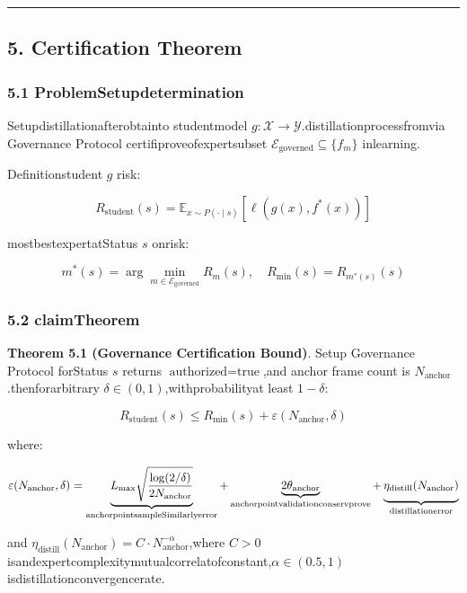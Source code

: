 \documentclass[
  12pt,
]{article}
\begin{document}
\begin{center}\rule{0.5\linewidth}{0.5pt}\end{center}

\subsection{5. Certification Theorem}\label{certification-theorem}

\subsubsection{5.1 ProblemSetupdetermination}\label{ux95eeux9898ux8bbeux5b9a}

Setupdistillationafterobtainto studentmodel \(g: \mathcal{X} \to \mathcal{Y}\).distillationprocessfromvia
Governance Protocol certifiproveofexpertsubset
\(\mathcal{E}_{\text{governed}} \subseteq \{f_m\}\) inlearning.

Definitionstudent \(g\) risk:

\[R_{\text{student}}(s) = \mathbb{E}_{x \sim P(\cdot \mid s)}[\ell(g(x), f^*(x))]\]

mostbestexpertatStatus \(s\) onrisk:

\[m^*(s) = \arg\min_{m \in \mathcal{E}_{\text{governed}}} R_m(s), \quad R_{\min}(s) = R_{m^*(s)}(s)\]

\subsubsection{5.2 claimTheorem}\label{ux4e3bux5b9aux7406}

\textbf{Theorem 5.1 (Governance Certification Bound)}. Setup Governance
Protocol forStatus \(s\) returns
\(\text{authorized} = \text{true}\),and anchor frame count is
\(N_{\text{anchor}}\).thenforarbitrary \(\delta \in (0, 1)\),withprobabilityat least
\(1 - \delta\):

\[R_{\text{student}}(s) \le R_{\min}(s) + \varepsilon(N_{\text{anchor}}, \delta)\]

where:

\[\varepsilon(N_{\text{anchor}}, \delta) = \underbrace{L_{\max} \sqrt{\frac{\log(2/\delta)}{2N_{\text{anchor}}}}}_{\text{anchorpointsampleSimilarlyerror}} + \underbrace{2\theta_{\text{anchor}}}_{\text{anchorpointvalidationconservprove}} + \underbrace{\vphantom{\sqrt{\frac{\log}{2N}}} \eta_{\text{distill}}(N_{\text{anchor}})}_{\text{distillationerror}}\]

and
\(\eta_{\text{distill}}(N_{\text{anchor}}) = C \cdot N_{\text{anchor}}^{-\alpha}\),where
\(C > 0\) isandexpertcomplexitymutualcorrelatofconstant,\(\alpha \in (0.5, 1)\)
isdistillationconvergencerate.
\end{document}
